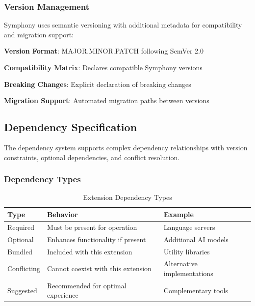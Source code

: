 \subsubsection{Version Management}
\label{subsubsec:version-management}

Symphony uses semantic versioning with additional metadata for compatibility and migration support:

\begin{compactlist}
\item \textbf{Version Format}: MAJOR.MINOR.PATCH following SemVer 2.0
\item \textbf{Compatibility Matrix}: Declares compatible Symphony versions
\item \textbf{Breaking Changes}: Explicit declaration of breaking changes
\item \textbf{Migration Support}: Automated migration paths between versions
\end{compactlist}

\subsection{Dependency Specification}
\label{subsec:dependency-specification}

The dependency system supports complex dependency relationships with version constraints, optional dependencies, and conflict resolution.

\subsubsection{Dependency Types}
\label{subsubsec:dependency-types}

\begin{table}[h]
\centering
\caption{Extension Dependency Types}
\label{tab:dependency-types}
\begin{tabular}{@{}lll@{}}
\toprule
\textbf{Type} & \textbf{Behavior} & \textbf{Example} \\
\midrule
Required & Must be present for operation & Language servers \\
Optional & Enhances functionality if present & Additional AI models \\
Bundled & Included with this extension & Utility libraries \\
Conflicting & Cannot coexist with this extension & Alternative implementations \\
Suggested & Recommended for optimal experience & Complementary tools \\
\bottomrule
\end{tabular}
\end{table}

